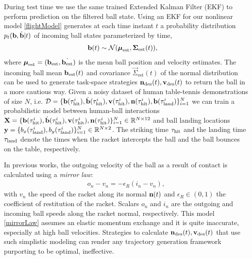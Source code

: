 During test time we use the same trained Extended Kalman Filter (EKF) to perform prediction on the filtered ball state. 
Using an EKF for our nonlinear model \eqref{flightModel} generates at each time instant $t$ a probability distribution $p_t(\boldsymbol{\mathrm{b}},\dot{\boldsymbol{\mathrm{b}}}|t)$ of incoming ball states parameterized by time, 
%
\begin{align}
\boldsymbol{\mathrm{b}}(t) &\sim \mathcal{N}(\boldsymbol{\mathrm{\mu}}_{\mathrm{est}},\boldsymbol{\mathrm{\Sigma}}_{\mathrm{est}}(t)),
\label{ballProcess}
\end{align}
%
\noindent where $\boldsymbol{\mathrm{\mu}}_{\mathrm{est}} = (\boldsymbol{\mathrm{b}}_{\mathrm{est}},\dot{\boldsymbol{\mathrm{b}}_{\mathrm{est}}})$ is the mean ball position and velocity estimates.
%
The incoming ball mean $\boldsymbol{\mathrm{b}}_{\mathrm{est}}(t)$ and covariance $\vec{\Sigma}_{\mathrm{est}}(t)$ of the normal distribution can be used to generate task-space strategies $\boldsymbol{\mathrm{n}}_{\mathrm{des}}(t), \boldsymbol{\mathrm{v}}_{\mathrm{des}}(t)$ to return the ball in a more cautious way. Given a noisy dataset of human table-tennis demonstrations of size $N$, i.e. $\mathcal{D} = \{\boldsymbol{\mathrm{b}}(\tau_{\mathrm{hit}}^i), \dot{\boldsymbol{\mathrm{b}}}(\tau_{\mathrm{hit}}^i), \boldsymbol{\mathrm{v}}(\tau_{\mathrm{hit}}^i), \boldsymbol{\mathrm{n}}(\tau_{\mathrm{hit}}^i), \boldsymbol{\mathrm{b}}(\tau_{\mathrm{land}}^i)\}_{i=1}^{N}$ we can train a probabilistic model between human-ball interactions $\boldsymbol{\mathrm{X}} = \{\boldsymbol{\mathrm{b}}(\tau_{\mathrm{hit}}^i), \dot{\boldsymbol{\mathrm{b}}}(\tau_{\mathrm{hit}}^i), \boldsymbol{\mathrm{v}}(\tau_{\mathrm{hit}}^i), \boldsymbol{\mathrm{n}}(\tau_{\mathrm{hit}}^i)\}_{i=1}^{N} \in \mathbb{R}^{N \times 12}$ and ball landing locations $\boldsymbol{\mathrm{y}} = \{b_x(\tau_{\mathrm{land}}^i), b_y(\tau_{\mathrm{land}}^i)\}_{i=1}^{N} \in \mathbb{R}^{N \times 2}$. The striking time $\tau_{\mathrm{hit}}$ and the landing time $\tau_{\mathrm{land}}$ denote the times when the racket intercepts the ball and the ball bounces on the table, respectively.  	

In previous works, the outgoing velocity of the ball as a result of contact is calculated using a \emph{mirror law}: 
%
\begin{align}
o_{n} - v_{n} = -\epsilon_{R} (i_{n} - v_{n}),
\label{mirrorLaw}
\end{align}
%
\noindent with $v_{n}$ the speed of the racket along its normal $\boldsymbol{\mathrm{n}}(t)$ and $\epsilon_{R} \in (0,1)$ the coefficient of restitution of the racket. Scalars $o_{n}$ and $i_{n}$ are the outgoing and incoming ball speeds along the racket normal, respectively. This model \eqref{mirrorLaw} assumes an elastic momentum exchange and it is quite inaccurate, especially at high ball velocities. Strategies to calculate $\boldsymbol{\mathrm{n}}_{\mathrm{des}}(t), \boldsymbol{\mathrm{v}}_{\mathrm{des}}(t)$ that use such simplistic modeling can render any trajectory generation framework purporting to be optimal, ineffective.

